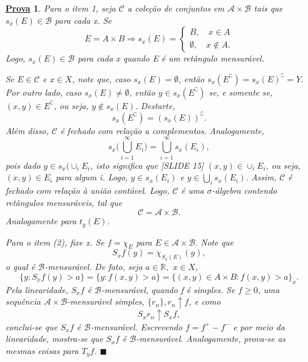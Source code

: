 \documentclass{article}
\newtheorem*{proof*}{\underline{Prova}}
\renewcommand\qedsymbol{$\blacksquare$}
\begin{document}
\begin{proof*}
  Para o item 1, seja \(\mathcal{C}\) a coleção de conjuntos em \(\mathcal{A}\times \mathcal{B}\) tais que \(s_x(E)\in \mathcal{B}\) para cada x. Se 
    \[
      E = A\times B \Rightarrow s_x(E)  = \left\{\begin{array}{ll}
          B,\quad x\in A\\ 
          \emptyset ,\quad x\not\in A.
        \end{array}\right.
    \]
    Logo, \(s_x(E)\in \mathcal{B}\) para cada x quando E é um retângulo mensurável. 

    Se \(E\in \mathcal{C}\) e \(x\in X\), note que, caso \(s_x(E) = \emptyset \), então \(s_x(E ^{\complement}) = s_x(E)^{\complement} = Y.\) Por outro lado, caso \(s_x(E)\neq\emptyset\),
então \(y\in s_x(E ^{\complement})\) se, e somente se, \((x, y)\in E ^{\complement}\), ou seja, \(y\not\in s_x(E).\) Destarte, 
  \[
    s_x(E ^{\complement}) = (s_x(E))^{\complement}.
  \]
  Além disso, \(\mathcal{C}\) é fechado com relação a complementos. Analogamente, 
    \[
      s_x \biggl( \bigcup_{i=1}^{\infty}E_{i}\biggr) = \bigcup_{i=1}^{\infty}s_x(E_{i}),
    \]
    pois dado \(y\in s_x(\cup_i E_{i}\), isto significa que [SLIDE 15] \((x, y)\in \cup_i E_{i}\), ou seja, \((x, y)\in E_{i}\) para algum i. Logo, \(y\in s_x(E_{i})\) e \(y\in \bigcup_{i}^{}s_{x}(E_{i}).\)
  Assim, \(\mathcal{C}\) é fechado com relação à união contável. Logo, \(\mathcal{C}\) é uma \(\sigma \)-álgebra contendo retângulos mensuráveis, tal que 
    \[
      \mathcal{C} = \mathcal{A}\times \mathcal{B}.
    \]
    Analogamente para \(t_y(E).\)

    Para o item (2), fixe x. Se \(f=\chi_{E}\) para \(E\in \mathcal{A}\times \mathcal{B}.\) Note que 
      \[
        S_xf(y) = \chi_{S_x(E)}(y),
      \]
    o qual é \(\mathcal{B}\)-mensurável. De fato, seja \(a\in \mathbb{R},\) \(x\in X\), 
      \[
        \{y: S_{x}f(y) > a\} = \{y:f(x, y) > a\} = \{(x, y)\in A\times B: f(x, y) > a\}_{x}.
      \]
    Pela linearidade, \(S_{x}f\) é \(\mathcal{B}\)-mensurável, quando f é simples. Se \(f\geq 0\), uma sequência \(\mathcal{A}\times \mathcal{B}\)-mensurável simples, \(\{r_{n}\}, r_{n}\uparrow f\), e como 
      \[
        S_xr_{n}\uparrow S_{x}f,
      \]
    conclui-se que \(S_xf\) é \(\mathcal{B}\)-mensurável. Escrevendo \(f=f^{+}-f^{-}\) e por meio da linearidade, mostra-se que \(S_{x}f\) é \(\mathcal{B}\)-mensurável. Analogamente, prova-se as mesmas coisas
    para \(T_{y}f\). \qedsymbol
\end{proof*}
\end{document}
